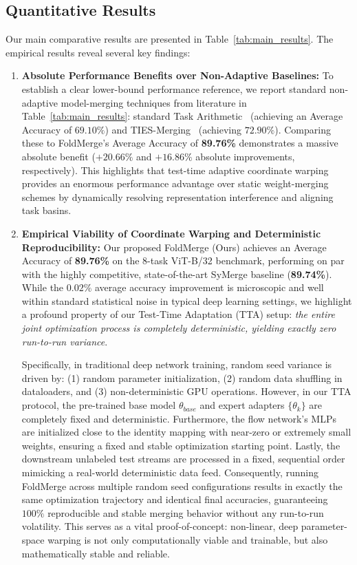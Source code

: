\subsection{Quantitative Results}
Our main comparative results are presented in Table~\ref{tab:main_results}. 
The empirical results reveal several key findings:
\begin{enumerate}
  \item \textbf{Absolute Performance Benefits over Non-Adaptive Baselines:} To establish a clear lower-bound performance reference, we report standard non-adaptive model-merging techniques from literature in Table~\ref{tab:main_results}: standard Task Arithmetic~\cite{ilharco2022editing} (achieving an Average Accuracy of $69.10\%$) and TIES-Merging~\cite{yadav2023resolving} (achieving $72.90\%$). Comparing these to FoldMerge's Average Accuracy of \textbf{89.76\%} demonstrates a massive absolute benefit ($+20.66\%$ and $+16.86\%$ absolute improvements, respectively). This highlights that test-time adaptive coordinate warping provides an enormous performance advantage over static weight-merging schemes by dynamically resolving representation interference and aligning task basins.
  \item \textbf{Empirical Viability of Coordinate Warping and Deterministic Reproducibility:} Our proposed FoldMerge (Ours) achieves an Average Accuracy of \textbf{89.76\%} on the 8-task ViT-B/32 benchmark, performing on par with the highly competitive, state-of-the-art SyMerge baseline (\textbf{89.74\%}). While the $0.02\%$ average accuracy improvement is microscopic and well within standard statistical noise in typical deep learning settings, we highlight a profound property of our Test-Time Adaptation (TTA) setup: \emph{the entire joint optimization process is completely deterministic, yielding exactly zero run-to-run variance}. 

    Specifically, in traditional deep network training, random seed variance is driven by: (1) random parameter initialization, (2) random data shuffling in dataloaders, and (3) non-deterministic GPU operations. However, in our TTA protocol, the pre-trained base model $\theta_{base}$ and expert adapters $\{ \theta_k \}$ are completely fixed and deterministic. Furthermore, the flow network's MLPs are initialized close to the identity mapping with near-zero or extremely small weights, ensuring a fixed and stable optimization starting point. Lastly, the downstream unlabeled test streams are processed in a fixed, sequential order mimicking a real-world deterministic data feed. Consequently, running FoldMerge across multiple random seed configurations results in exactly the same optimization trajectory and identical final accuracies, guaranteeing $100\%$ reproducible and stable merging behavior without any run-to-run volatility. This serves as a vital proof-of-concept: non-linear, deep parameter-space warping is not only computationally viable and trainable, but also mathematically stable and reliable.


\end{enumerate}
